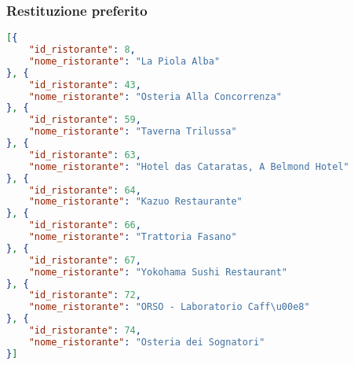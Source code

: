 \subsubsection{Restituzione preferito}
\begin{lstlisting}[language=json]
[{
    "id_ristorante": 8,
    "nome_ristorante": "La Piola Alba"
}, {
    "id_ristorante": 43,
    "nome_ristorante": "Osteria Alla Concorrenza"
}, {
    "id_ristorante": 59,
    "nome_ristorante": "Taverna Trilussa"
}, {
    "id_ristorante": 63,
    "nome_ristorante": "Hotel das Cataratas, A Belmond Hotel"
}, {
    "id_ristorante": 64,
    "nome_ristorante": "Kazuo Restaurante"
}, {
    "id_ristorante": 66,
    "nome_ristorante": "Trattoria Fasano"
}, {
    "id_ristorante": 67,
    "nome_ristorante": "Yokohama Sushi Restaurant"
}, {
    "id_ristorante": 72,
    "nome_ristorante": "ORSO - Laboratorio Caff\u00e8"
}, {
    "id_ristorante": 74,
    "nome_ristorante": "Osteria dei Sognatori"
}]
\end{lstlisting}
